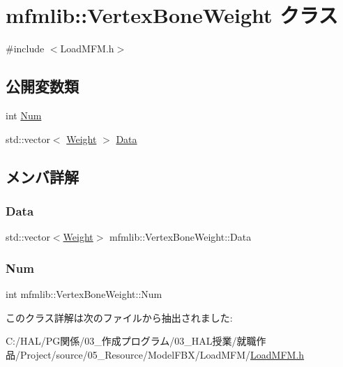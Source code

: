 \hypertarget{classmfmlib_1_1_vertex_bone_weight}{}\section{mfmlib\+:\+:Vertex\+Bone\+Weight クラス}
\label{classmfmlib_1_1_vertex_bone_weight}


{\ttfamily \#include $<$Load\+M\+F\+M.\+h$>$}

\subsection*{公開変数類}
\begin{DoxyCompactItemize}
\item 
int \mbox{\hyperlink{classmfmlib_1_1_vertex_bone_weight_ae5ef8b8e05724b82f358fa618cb0a9ef}{Num}}
\item 
std\+::vector$<$ \mbox{\hyperlink{structmfmlib_1_1_weight}{Weight}} $>$ \mbox{\hyperlink{classmfmlib_1_1_vertex_bone_weight_af4ad2362277d67a66908a5747ee17207}{Data}}
\end{DoxyCompactItemize}


\subsection{メンバ詳解}
\mbox{\label{classmfmlib_1_1_vertex_bone_weight_af4ad2362277d67a66908a5747ee17207}} 
\subsubsection{\texorpdfstring{Data}{Data}}
{\footnotesize\ttfamily std\+::vector$<$\mbox{\hyperlink{structmfmlib_1_1_weight}{Weight}}$>$ mfmlib\+::\+Vertex\+Bone\+Weight\+::\+Data}

\mbox{\label{classmfmlib_1_1_vertex_bone_weight_ae5ef8b8e05724b82f358fa618cb0a9ef}} 
\subsubsection{\texorpdfstring{Num}{Num}}
{\footnotesize\ttfamily int mfmlib\+::\+Vertex\+Bone\+Weight\+::\+Num}



このクラス詳解は次のファイルから抽出されました\+:\begin{DoxyCompactItemize}
\item 
C\+:/\+H\+A\+L/\+P\+G関係/03\+\_\+作成プログラム/03\+\_\+\+H\+A\+L授業/就職作品/\+Project/source/05\+\_\+\+Resource/\+Model\+F\+B\+X/\+Load\+M\+F\+M/\mbox{\hyperlink{_load_m_f_m_8h}{Load\+M\+F\+M.\+h}}\end{DoxyCompactItemize}
